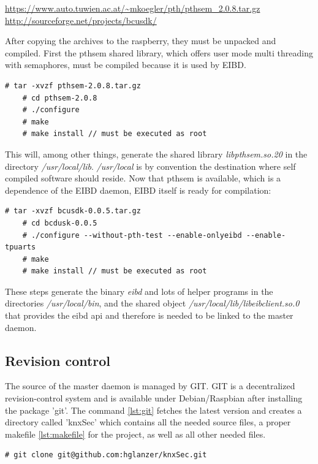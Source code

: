 \url{https://www.auto.tuwien.ac.at/~mkoegler/pth/pthsem_2.0.8.tar.gz}
\url{http://sourceforge.net/projects/bcusdk/}

After copying the archives to the raspberry, they must be unpacked and compiled. First the pthsem shared library, which offers user mode multi
threading with semaphores, must be compiled because it is used by EIBD. 

\begin{lstlisting}[style=BashInputStyle]
    # tar -xvzf pthsem-2.0.8.tar.gz
    # cd pthsem-2.0.8
    # ./configure
    # make
    # make install // must be executed as root
\end{lstlisting}

This will, among other things, generate the shared library \textit{libpthsem.so.20} in the directory \textit{/usr/local/lib}. \textit{/usr/local}
 is by convention the destination where self compiled software should reside.
Now that pthsem is available, which is a dependence of the EIBD daemon, EIBD itself is ready for compilation:

\begin{lstlisting}[style=BashInputStyle]
    # tar -xvzf bcusdk-0.0.5.tar.gz
    # cd bcdusk-0.0.5
    # ./configure --without-pth-test --enable-onlyeibd --enable-tpuarts
    # make
    # make install // must be executed as root
\end{lstlisting}

These steps generate the binary \textit{eibd} and lots of helper programs in the directories \textit{/usr/local/bin}, and the shared object
\textit{/usr/local/lib/libeibclient.so.0} that provides the \gls{eibd} \gls{api} and therefore is needed to be linked to the master daemon. 

\subsection{Revision control}

The source of the master daemon is managed by GIT. GIT is a decentralized revision-control system and is available under Debian/Raspbian after installing
the package 'git'. The command \ref{lst:git} fetches the latest version and creates a directory called 'knxSec' which contains all the needed source files,
a proper makefile \ref{lst:makefile} for the project, as well as all other needed files.

\begin{lstlisting}[style=BashInputStyle,label=lst:git]
    # git clone git@github.com:hglanzer/knxSec.git
\end{lstlisting}


